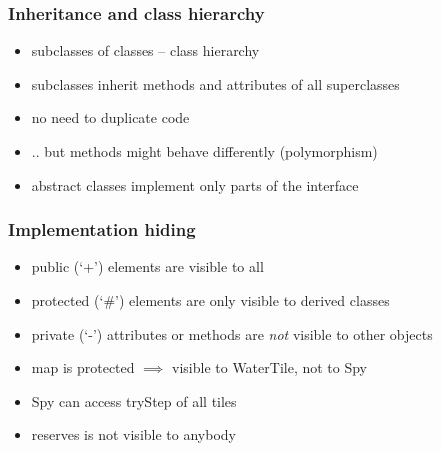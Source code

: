 \documentclass[UTF8]{beamer}
\begin{document}
\begin{frame}
  \frametitle{Inheritance and class hierarchy}

  \begin{center}
  \end{center}

  \begin{itemize}
    \item subclasses of classes -- \alert{class hierarchy}
    \item subclasses inherit methods and attributes of all superclasses
    \item no need to duplicate code
    \item .. but methods might behave differently
      (\alert{polymorphism})

    \item \alert{abstract class}es implement only parts of the interface
    \end{itemize}
\end{frame}

\begin{frame}
  \frametitle{Implementation hiding}
  \begin{center}
  \end{center}

  \begin{itemize}
  \item \alert{public} (`+') elements are visible to all
  \item \alert{protected} (`\#') elements are only visible to derived classes
  \item \alert{private} (`-') attributes or methods are \emph{not} visible to
    other objects
  \item map is protected $\implies$ visible to
    WaterTile, not to Spy
  \item Spy can access tryStep of all tiles
  \item reserves is not visible to anybody
  \end{itemize}
\end{frame}
\end{document}
